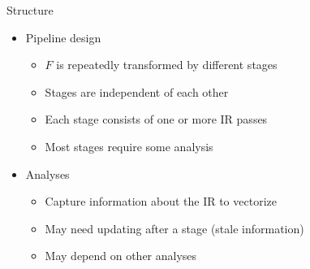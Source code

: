 

\begin{frame}{Structure}

\begin{itemize}
    \item Pipeline design
    \begin{itemize}
        \item $F$ is repeatedly transformed by different stages
        \item Stages are independent of each other
        \item Each stage consists of one or more IR passes
        \item Most stages require some analysis
    \end{itemize}
    \item Analyses
    \begin{itemize}
        \item Capture information about the IR to vectorize
        \item May need updating after a stage (stale information)
        \item May depend on other analyses
    \end{itemize}
\end{itemize}


\end{frame}


